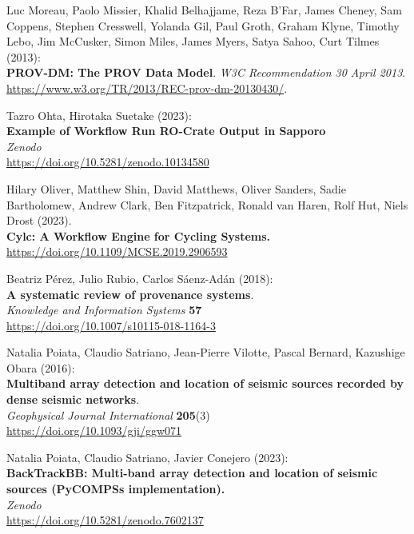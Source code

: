 \documentclass[10pt,letterpaper]{article}
\begin{document}
\begin{thebibliography}{10}
\begin{small}
Luc Moreau, Paolo Missier, Khalid Belhajjame, Reza B'Far, James Cheney, Sam Coppens, Stephen Cresswell, Yolanda Gil, Paul Groth, Graham Klyne, Timothy Lebo, Jim McCusker, Simon Miles, James Myers, Satya Sahoo, Curt Tilmes (2013):\\
\textbf{PROV-DM: The PROV Data Model}.
\emph{W3C Recommendation 30 April 2013}.\\
\url{https://www.w3.org/TR/2013/REC-prov-dm-20130430/}.

Tazro Ohta, Hirotaka Suetake (2023):\\
\textbf{Example of Workflow Run RO-Crate Output in Sapporo}\\
\emph{Zenodo}\\
\url{https://doi.org/10.5281/zenodo.10134580}

Hilary Oliver, Matthew Shin, David Matthews, Oliver Sanders, Sadie Bartholomew, Andrew Clark, Ben Fitzpatrick, Ronald van Haren, Rolf Hut, Niels Drost
(2023).\\
\textbf{Cylc: A Workflow Engine for Cycling Systems.}\\
\url{https://doi.org/10.1109/MCSE.2019.2906593}

Beatriz Pérez, Julio Rubio, Carlos Sáenz-Adán (2018):\\
\textbf{A systematic review of provenance systems}.\\
\emph{Knowledge and Information Systems} \textbf{57}\\
\url{https://doi.org/10.1007/s10115-018-1164-3} 

Natalia Poiata, Claudio Satriano, Jean-Pierre Vilotte, Pascal Bernard, Kazushige Obara (2016):\\
\textbf{Multiband array detection and location of seismic sources recorded by dense seismic networks}.\\
\emph{Geophysical Journal International} \textbf{205}(3)\\
\url{https://doi.org/10.1093/gji/ggw071}

Natalia Poiata, Claudio Satriano, Javier Conejero (2023):\\
\textbf{BackTrackBB: Multi-band array detection and location of seismic sources (PyCOMPSs implementation).}\\
\emph{Zenodo}\\
\url{https://doi.org/10.5281/zenodo.7602137}


\end{small}
\end{thebibliography}
\end{document}
